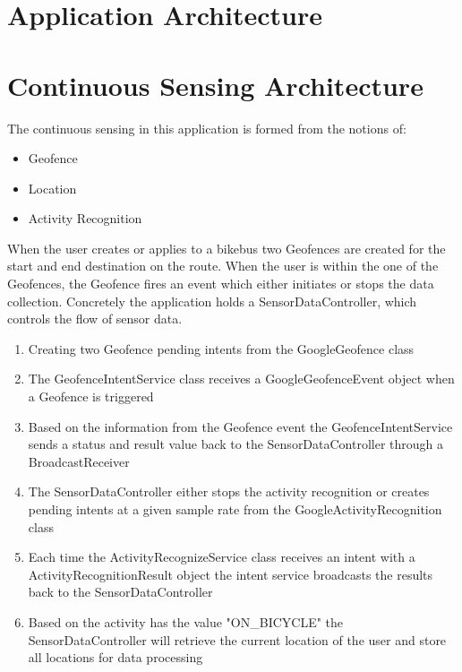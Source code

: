 

\section{Application Architecture}



\section{Continuous Sensing Architecture}

The continuous sensing in this application is formed from the notions of:
\begin{itemize}
    \item Geofence 
    \item Location 
    \item Activity Recognition
\end{itemize}

When the user creates or applies to a bikebus two Geofences are created for the start and end destination on the route. When the user is within the one of the Geofences, the Geofence fires an event which either initiates or stops the data collection.
Concretely the application holds a SensorDataController, which controls the flow of sensor data. 
\begin{enumerate}
    \item Creating two Geofence pending intents from the GoogleGeofence class
    \item The GeofenceIntentService class receives a GoogleGeofenceEvent object when a Geofence is triggered
    \item Based on the information from the Geofence event the GeofenceIntentService sends a status and result value back to the SensorDataController through a BroadcastReceiver
    \item The SensorDataController either stops the activity recognition or creates pending intents at a given sample rate from the GoogleActivityRecognition class
    \item Each time the ActivityRecognizeService class receives an intent with a ActivityRecognitionResult object the intent service broadcasts the results back to the SensorDataController
    \item Based on the activity has the value "ON\_BICYCLE" the SensorDataController will retrieve the current location of the user and store all locations for data processing
\end{enumerate}

